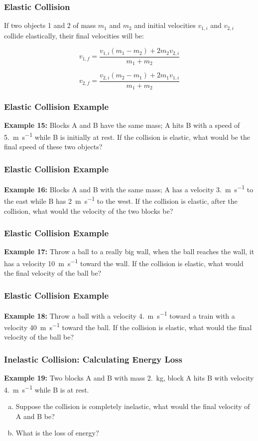 \documentclass[12pt,compress,aspectratio=169]{beamer}
\begin{document}
\begin{frame}
  \frametitle{Elastic Collision}
  If two objects 1 and 2 of mass $m_1$ and $m_2$ and initial velocities
  $v_{1,i}$ and $v_{2,i}$ collide elastically, their final velocities will be:
  
  {\Large
    \begin{displaymath}
      v_{1,f}=\frac{v_{1,i}(m_1-m_2)+2m_2v_{2,i}}{m_1+m_2}
    \end{displaymath}
    
    \begin{displaymath}
      v_{2,f}=\frac{v_{2,i}(m_2-m_1)+2m_1v_{1,i}}{m_1+m_2}
    \end{displaymath}
  }
\end{frame}

\begin{frame}
  \frametitle{Elastic Collision Example}

  \textbf{Example 15:} Blocks A and B have the same mass; A hits B with a speed
  of \SI{5.}{\metre\per\second} while B is initially at rest. If the collision
  is elastic, what would be the final speed of these two objects?
\end{frame}


\begin{frame}
  \frametitle{Elastic Collision Example}
  \textbf{Example 16:} Blocks A and B with the same mass; A has a velocity
  \SI{3.}{\metre\per\second} to the east while B has \SI{2}{\metre\per\second}
  to the west. If the collision is elastic, after the collision, what would the
  velocity of the two blocks be?
\end{frame}


\begin{frame}
  \frametitle{Elastic Collision Example}
  
  \textbf{Example 17:} Throw a ball to a really big wall, when the ball reaches
  the wall, it has a velocity \SI{10}{\metre\per\second} toward the wall. If
  the collision is elastic, what would the final velocity of the ball be?
\end{frame}


\begin{frame}
  \frametitle{Elastic Collision Example}
  \textbf{Example 18:} Throw a ball with a velocity \SI{4.}{\metre\per\second}
  toward a train with a velocity \SI{40}{\metre\per\second} toward the ball.
  If the collision is elastic, what would the final velocity of the ball be?
\end{frame}


\begin{frame}
  \frametitle{Inelastic Collision: Calculating Energy Loss}
  \textbf{Example 19:} Two blocks A and B with mass \SI{2.}{\kilo\gram}, block
  A hits B with velocity \SI{4.}{\metre\per\second} while B is at rest.
  \begin{enumerate}[(a)]
  \item Suppose the collision is completely inelastic, what would the final
    velocity of A and B be?
  \item What is the loss of energy?
  \end{enumerate}
\end{frame}
\end{document}
